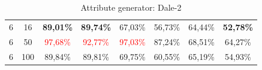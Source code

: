 \begin{table}[ht]
\begin{tabular}{cc|c|c|c|c|c|c}
        {6} & {16}  & \textbf{89,01\%}         & \textbf{89,74\%}         & {67,03\%}                & {56,73\%}                & {64,44\%}                 & \textbf{52,78\%}          \\
        {6} & {50}  & \textcolor{red}{97,68\%} & \textcolor{red}{92,77\%} & \textcolor{red}{97,03\%} & {87,24\%}                & {68,51\%}                 & {64,27\%}                 \\
        {6} & {100} & {89,84\%}                & {89,81\%}                & {69,75\%}                & {60,55\%}                & {65,19\%}                 & {54,93\%}                 \\
        \bottomrule
    \end{tabular}
    \caption{Attribute generator: Dale-2}
    \label{tab:probing:attribute-generator:dale-2}
\end{table}

